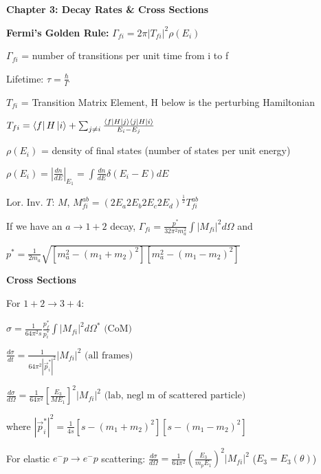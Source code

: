 \textbf{Chapter 3: Decay Rates \& Cross Sections}

\textbf{Fermi's Golden Rule:} $\Gamma_{fi} = 2\pi |T_{fi}|^2 \rho(E_i)$

$\Gamma_{fi}$ = number of transitions per unit time from i to f

Lifetime: $\tau = \frac{\hbar}{\Gamma}$

$T_{fi}$ = Transition Matrix Element, H below is the perturbing Hamiltonian

$T_{fi} = \bra{f}H\ket{i} + \sum_{j \neq i} \frac{\bra{f}H\ket{j}\bra{j}H\ket{i}}{E_i - E_j}$

$\rho(E_i)$ = density of final states (number of states per unit energy)

$\rho(E_i) = \left|\frac{dn}{dE}\right|_{E_1} = \int \frac{dn}{dE} \delta(E_i - E)dE$

Lor. Inv. $T$: $M$, $M_{fi}^{ab} = (2E_a2E_b2E_c2E_d)^{\frac{1}{2}}T_{fi}^{ab}$

If we have an $a \to 1 + 2$ decay,
$\Gamma_{fi} = \frac{p^*}{32\pi^2m_a^2} \int |M_{fi}|^2 d\Omega$ and

$p^* = \frac{1}{2m_a} \sqrt{\left[m_a^2 - (m_1 + m_2)^2\right]\left[m_a^2 - (m_1 - m_2)^2\right]}$

\textbf{Cross Sections}

For $1+2 \to 3+4$:

$\sigma = \frac{1}{64\pi^2 s} \frac{p_f^*}{p_i^*} \int |M_{fi}|^2 d\Omega^* \text{ (CoM)}$

$\frac{d\sigma}{dt} = \frac{1}{64\pi^2 |\vec{p}_i^*|^2} |M_{fi}|^2 \text{ (all frames)}$

$\frac{d\sigma}{d\Omega} = \frac{1}{64\pi^2} \left[\frac{E_3}{ME_1}\right]^2|M_{fi}|^2 \text{ (lab, negl m of scattered particle)}$

where $|\vec{p}_i^*|^2 = \frac{1}{4s}\left[s - (m_1 + m_2)^2\right]\left[s - (m_1 - m_2)^2\right]$

For elastic $e^- p \to e^- p$ scattering:
$\frac{d\sigma}{d\Omega} = \frac{1}{64\pi^2} \left(\frac{E_3}{m_p E_1}\right)^2 |M_{fi}|^2$
($E_3 = E_3(\theta)$)
